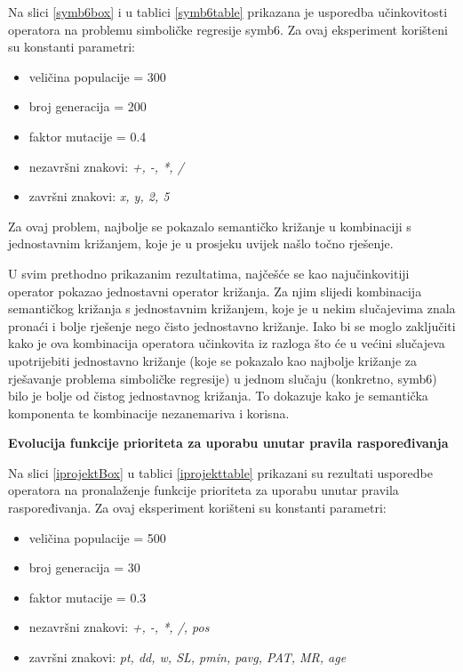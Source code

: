 Na slici \ref{symb6box} i u tablici \ref{symb6table} prikazana je usporedba učinkovitosti operatora na problemu simboličke regresije symb6. Za ovaj eksperiment korišteni su konstanti parametri:
\begin{itemize}
\item{veličina populacije = 300}
\item{broj generacija = 200}
\item{faktor mutacije = 0.4}
\item{nezavršni znakovi: \textit{ +, -, *, /}}
\item{završni znakovi: \textit{x, y, 2, 5}}
\end{itemize} 

Za ovaj problem, najbolje se pokazalo semantičko križanje u kombinaciji s jednostavnim križanjem, koje je u prosjeku uvijek našlo točno rješenje.


U svim prethodno prikazanim rezultatima, najčešće se kao najučinkovitiji operator pokazao jednostavni operator križanja. Za njim slijedi kombinacija semantičkog križanja s jednostavnim križanjem, koje je u nekim slučajevima znala pronaći i bolje rješenje nego čisto jednostavno križanje. Iako bi se moglo zaključiti kako je ova kombinacija operatora učinkovita iz razloga što će u većini slučajeva upotrijebiti jednostavno križanje (koje se pokazalo kao najbolje križanje za rješavanje problema simboličke regresije) u jednom slučaju (konkretno, symb6) bilo je bolje od čistog jednostavnog križanja. To dokazuje kako je semantička komponenta te kombinacije nezanemariva i korisna.



\textbf{Evolucija funkcije prioriteta za uporabu unutar pravila raspoređivanja}

Na slici \ref{iprojektBox} u tablici \ref{iprojekttable} prikazani su rezultati usporedbe operatora na pronalaženje funkcije prioriteta za uporabu unutar pravila raspoređivanja. Za ovaj eksperiment korišteni su konstanti parametri:
\begin{itemize}
\item{veličina populacije = 500}
\item{broj generacija = 30}
\item{faktor mutacije = 0.3}
\item{nezavršni znakovi: \textit{+, -, *, /, pos}}
\item{završni znakovi: \textit{pt, dd, w, SL, pmin, pavg, PAT, MR, age}}
\end{itemize} 

